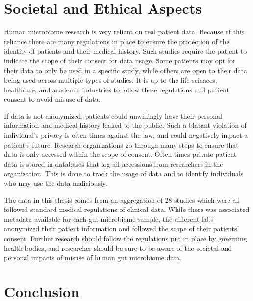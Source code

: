 \section{Societal and Ethical Aspects}
Human microbiome research is very reliant on real patient data. Because of this reliance there are many regulations in place to ensure the protection of the identity of patients and their medical history. Such studies require the patient to indicate the scope of their consent for data usage. Some patients may opt for their data to only be used in a specific study, while others are open to their data being used across multiple types of studies. It is up to the life sciences, healthcare, and academic industries to follow these regulations and patient consent to avoid misuse of data.

If data is not anonymized, patients could unwillingly have their personal information and medical history leaked to the public. Such a blatant violation of individual's privacy is often times against the law, and could negatively impact a patient's future. Research organizations go through many steps to ensure that data is only accessed within the scope of consent. Often times private patient data is stored in databases that log all accessions from researchers in the organization. This is done to track the usage of data and to identify individuals who may use the data maliciously.

The data in this thesis comes from an aggregation of 28 studies which were all followed standard medical regulations of clinical data. While there was associated metadata available for each gut microbiome sample, the different labs anonymized their patient information and followed the scope of their patients' consent. Further research should follow the regulations put in place by governing health bodies, and researcher should be sure to be aware of the societal and personal impacts of misuse of human gut microbiome data.

\section{Conclusion}

